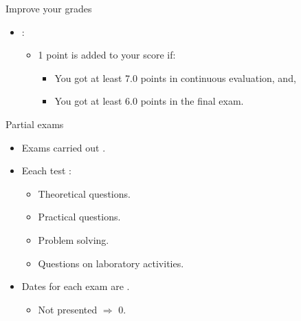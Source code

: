 \begin{frame}[t]{Improve your grades}
\begin{itemize}
  \item {}:
    \begin{itemize}
      \item 1 point is added to your score if:
        \begin{itemize}
          \item You got at least 7.0 points in continuous evaluation, and,
          \item You got at least 6.0 points in the final exam.
        \end{itemize}
    \end{itemize}
\end{itemize}
\end{frame}

\begin{frame}[t]{Partial exams}
\begin{itemize}
  \item Exams carried out .

  \item Eeach test :
    \begin{itemize}
      \item Theoretical questions.
      \item Practical questions.
      \item Problem solving.
      \item Questions on laboratory activities.
    \end{itemize}

  \item Dates for each exam are .

    \begin{itemize}
      \item Not presented $\Rightarrow$ 0.
    \end{itemize}
\end{itemize}
\end{frame}


